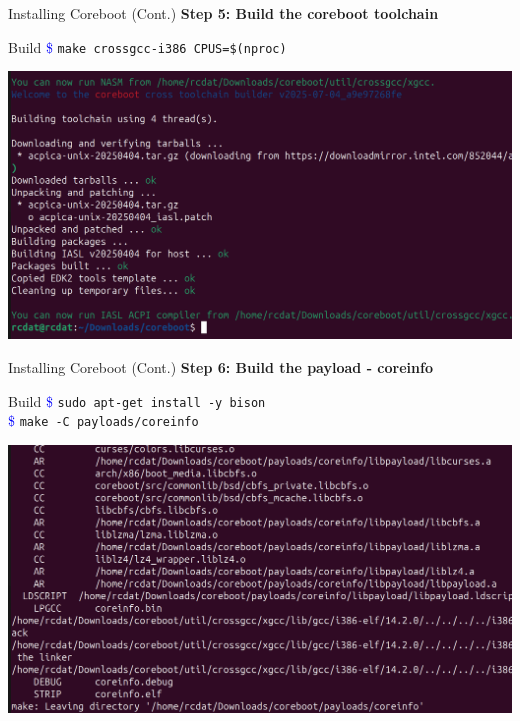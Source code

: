 \documentclass{beamer}
\begin{document}
	
	
	
	
	
	\begin{frame}{Installing Coreboot (Cont.)}
		\textbf{Step 5: Build the coreboot toolchain}
		
		\begin{exampleblock}{Build}
			\textcolor{blue}{\$} \texttt{make crossgcc-i386 CPUS=\$(nproc)}
		\end{exampleblock}
		
		\centering
		\includegraphics[width=0.8\linewidth]{images/img0}
	\end{frame}
	
	
	\begin{frame}{Installing Coreboot (Cont.)}
		\textbf{Step 6: Build the payload - coreinfo}
		
		\begin{exampleblock}{Build}
			\textcolor{blue}{\$} \texttt{sudo apt-get install -y bison} \\
				\hspace*{0em}\textcolor{blue}{\$} \texttt{make -C payloads/coreinfo} \\
		\end{exampleblock}
		
		\centering
		\includegraphics[width=0.8\linewidth]{images/img1}
	\end{frame}
	
	
	
\end{document}
